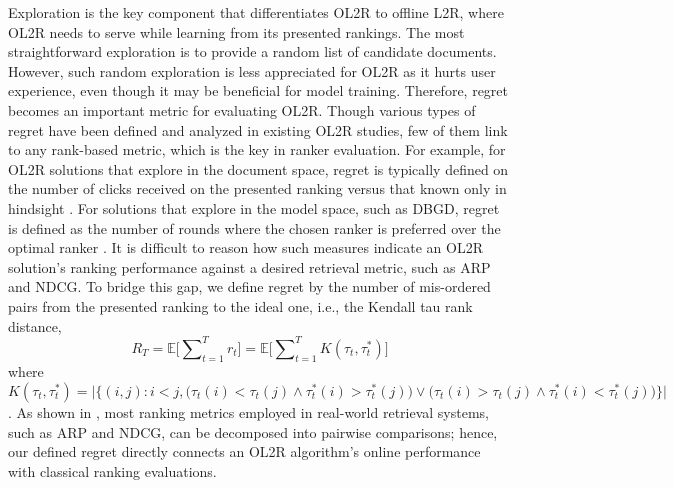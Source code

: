 Exploration is the key component that differentiates OL2R to offline L2R, where OL2R needs to serve while learning from its presented rankings. 
The most straightforward exploration is to provide a random list of candidate documents. However, such random exploration is less appreciated for OL2R as it hurts user experience, even though it may be beneficial for model training.
Therefore, regret becomes an important metric for evaluating OL2R.
Though various types of regret have been defined and analyzed in existing OL2R studies, few of them link to any rank-based metric, which is the key in ranker evaluation. For example, for OL2R solutions that explore in the document space, regret is typically defined on the number of clicks received on the presented ranking versus that known only in hindsight \cite{li2016contextual,kveton2015cascading,zoghi2017online,lattimore2018toprank}. For solutions that explore in the model space, such as DBGD, regret is defined as the number of rounds where the chosen ranker is preferred over the optimal ranker \cite{yue2009interactively,wang2019variance}. It is difficult to reason how such measures indicate an OL2R solution's ranking performance against a desired retrieval metric, such as ARP and NDCG.
To bridge this gap, we define regret by the number of mis-ordered pairs from the presented ranking to the ideal one, i.e., the Kendall tau rank distance,
\begin{equation*}
    R_T = \mathbb{E}\big[\sum\nolimits_{t=1}^T r_t\big] = \mathbb{E} \big[\sum\nolimits_{t=1}^T K(\tau_t, \tau_t^*)\big]
\end{equation*}
where $K(\tau_t, \tau_t^*)=\Big|\big\{(i,j):i<j,\big(\tau_{t}(i)<\tau _{t}(j)\wedge \tau^*_{t}(i)>\tau^*_{t}(j)\big)\vee \big(\tau _{t}(i)>\tau _{t}(j)\wedge \tau^*_{t}(i)<\tau^*_{t}(j)\big)\big\}\Big|$. As shown in \cite{Wang2018Lambdaloss}, most ranking metrics employed in real-world retrieval systems, such as ARP and NDCG, can be decomposed into pairwise comparisons; hence, our defined regret directly connects an OL2R algorithm's online performance with classical ranking evaluations.


